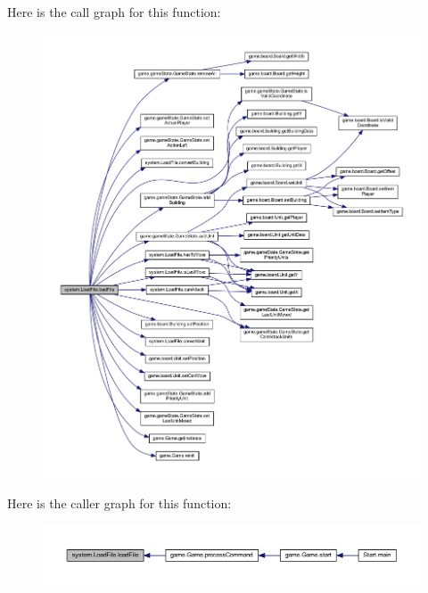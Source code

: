 Here is the call graph for this function\+:
\nopagebreak
\begin{figure}[H]
\begin{center}
\leavevmode
\includegraphics[width=350pt]{classsystem_1_1_load_file_adf1c31e03c1dd422118d122ef17dc96e_cgraph}
\end{center}
\end{figure}
Here is the caller graph for this function\+:
\nopagebreak
\begin{figure}[H]
\begin{center}
\leavevmode
\includegraphics[width=350pt]{classsystem_1_1_load_file_adf1c31e03c1dd422118d122ef17dc96e_icgraph}
\end{center}
\end{figure}
\mbox{\label{classsystem_1_1_load_file_ae74023593b3080a395c9816e3cf220d1}} 

